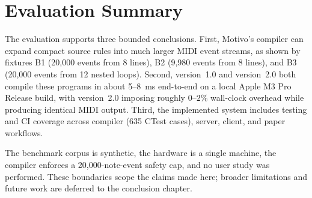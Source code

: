 \section{Evaluation Summary}\label{sec:evaluation-summary}

The evaluation supports three bounded conclusions.
First, Motivo's compiler can expand compact source rules into much larger MIDI event streams, as shown by fixtures B1
(20,000 events from 8 lines), B2 (9,980 events from 8 lines), and B3 (20,000 events from 12 nested loops).
Second, version~1.0 and version~2.0 both compile these programs in about 5--8~ms end-to-end on a local Apple M3 Pro
Release build, with version~2.0 imposing roughly $0$--$2\%$ wall-clock overhead while producing identical MIDI output.
Third, the implemented system includes testing and CI coverage across compiler (635 CTest cases), server, client, and
paper workflows.

The benchmark corpus is synthetic, the hardware is a single machine, the compiler enforces a 20,000-note-event safety
cap, and no user study was performed.
These boundaries scope the claims made here; broader limitations and future work are deferred to the conclusion chapter.
